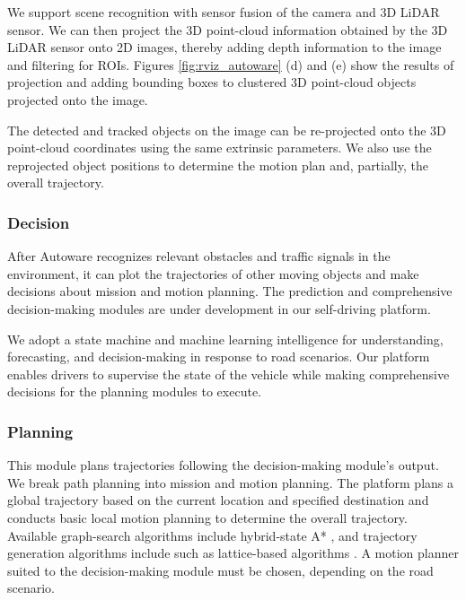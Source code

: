 We support scene recognition with sensor fusion of the camera and 3D LiDAR sensor.
We can then project the 3D point-cloud information obtained by the 3D LiDAR sensor onto 2D images, thereby adding depth information to the image and filtering for ROIs.
Figures \ref{fig:rviz_autoware} (d) and (e) show the results of projection and adding bounding boxes to clustered 3D point-cloud objects projected onto the image.

The detected and tracked objects on the image can be re-projected onto the 3D point-cloud coordinates using the same extrinsic parameters.
We also use the reprojected object positions to determine the motion plan and, partially, the overall trajectory.

\subsubsection{Decision}
\label{sec:decision}

After Autoware recognizes relevant obstacles and traffic signals in the environment, it can plot the trajectories of other moving objects and make decisions about mission and motion planning.
The prediction and comprehensive decision-making modules are under development in our self-driving platform.

We adopt a state machine and machine learning intelligence for understanding, forecasting, and decision-making in response to road scenarios.
Our platform enables drivers to supervise the state of the vehicle while making comprehensive decisions for the planning modules to execute.

\subsubsection{Planning}
This module plans trajectories following the decision-making module's output.
We break path planning into mission and motion planning.
The platform plans a global trajectory based on the current location and specified destination and conducts basic local motion planning to determine the overall trajectory.
Available graph-search algorithms include hybrid-state A* \cite{dolgov2010path}, and trajectory generation algorithms include \cite{nagy2001trajectory} such as lattice-based algorithms \cite{darweesh2017open}.
A motion planner suited to the decision-making module must be chosen, depending on the road scenario.

